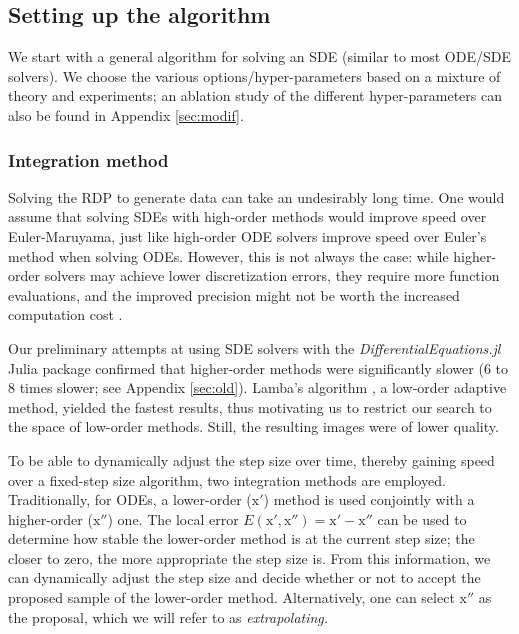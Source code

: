 \documentclass{article}
\newcommand{\x}{\boldsymbol{\mathrm{x}}}
\begin{document}
\subsection{Setting up the algorithm}

We start with a general algorithm for solving an SDE (similar to most ODE/SDE solvers). We choose the various options/hyper-parameters based on a mixture of theory and experiments; an ablation study of the different hyper-parameters can also be found in Appendix \ref{sec:modif}.

\subsubsection{Integration method}\label{sec:int}

Solving the RDP to generate data can take an undesirably long time. One would assume that solving SDEs with high-order methods would improve speed over Euler-Maruyama, just like high-order ODE solvers improve speed over Euler's method when solving ODEs. However, this is not always the case: while higher-order solvers may achieve lower discretization errors, they require more function evaluations, 
and the improved precision might not be worth the increased computation cost
\citep{lehn2002adaptive, lamba2003adaptive}. 

Our preliminary attempts at using SDE solvers with the {\em DifferentialEquations.jl} Julia package \citep{DifferentialEquations.jl-2017} confirmed that higher-order methods were significantly slower (6 to 8 times slower; see Appendix \ref{sec:old}). Lamba's algorithm \citep{lamba2003adaptive}, a low-order adaptive method, yielded the fastest results, thus motivating us to restrict our search to the space of low-order methods. Still, the resulting images were of lower quality.

To be able to dynamically adjust the step size over time, thereby gaining speed over a fixed-step size algorithm, two integration methods are employed. Traditionally, for ODEs, a lower-order ($\x'$) method is used conjointly with a higher-order ($\x''$) one. The local error $E(\x',\x'') = \x' - \x''$ 
can be used to determine how stable the lower-order method is at the current step size; the closer to zero, the more appropriate the step size is. From this information, we can dynamically adjust the step size and decide whether or not to accept the proposed sample of the lower-order method. Alternatively, one can select $\x''$ as the proposal, which we will refer to as \em extrapolating\em.
\end{document}
